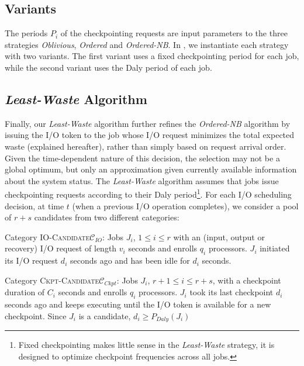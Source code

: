 \documentclass[conference,nofonttune]{IEEEtran}
\newcommand{\period}[1]{P_{#1}}
\newcommand{\IOcat}{\textsc{IO-Candidate}\xspace}
\newcommand{\Ckptcat}{\textsc{Ckpt-Candidate}\xspace}
\newcommand{\Catiocat}{\mathcal{C}_{IO}\xspace}
\newcommand{\Catckptcat}{\mathcal{C}_{Ckpt}\xspace}
\newcommand{\nocoop}{\emph{Oblivious}\xspace}
\newcommand{\fifoblock}{\emph{Ordered}\xspace}
\newcommand{\fifononblock}{\emph{Ordered-NB}\xspace}
\newcommand{\leastwaste}{\emph{Least-Waste}\xspace}
\begin{document}
\subsection{Variants}
\label{sec:variants}

The periods $\period{i}$ of the checkpointing requests are input parameters to
the three strategies \nocoop, \fifoblock and \fifononblock. In
, we instantiate each strategy with two variants. The first
variant uses a fixed checkpointing period for each job, while the second
variant uses the Daly period of each job.
 
\subsection{\leastwaste Algorithm}
\label{sec:least-waste}

Finally, our \leastwaste algorithm further refines the \fifononblock algorithm
by issuing the I/O token to the job whose I/O request minimizes the total
expected waste (explained hereafter), rather than simply based on request
arrival order.  Given the time-dependent nature of this decision, the selection
may not be a global optimum, but only an approximation given currently
available information about the system status. The \leastwaste algorithm
assumes that jobs issue checkpointing requests according to their Daly
period\footnote{Fixed checkpointing makes little sense in the \leastwaste strategy,
it is designed to optimize checkpoint frequencies across all jobs.}.  For each
I/O scheduling decision, at time $t$ (when a previous I/O operation completes),
we consider a pool of $r+s$ candidates from two different categories:

\begin{compactitem}
\item Category \IOcat $\Catiocat$: Jobs $J_{i}$, $1\leq i \leq r$ with an
  (input, output or recovery) I/O request of length $v_{i}$ seconds and enrolls $q_{i}$
  processors. $J_{i}$ initiated its I/O request $d_{i}$ seconds ago and has been idle
  for $d_{i}$ seconds.

\item Category \Ckptcat $\Catckptcat$: Jobs $J_{i}$, $r+1\leq i \leq r+s$,
  with a checkpoint duration of $C_{i}$ seconds and enrolls $q_{i}$ processors.
  $J_{i}$ took its last checkpoint $d_{i}$ seconds ago and keeps executing until the
  I/O token is available for a new checkpoint. Since $J_{i}$ is a candidate,
  $d_{i} \geq \period{Daly}(J_{i})$
\end{compactitem}
\end{document}
